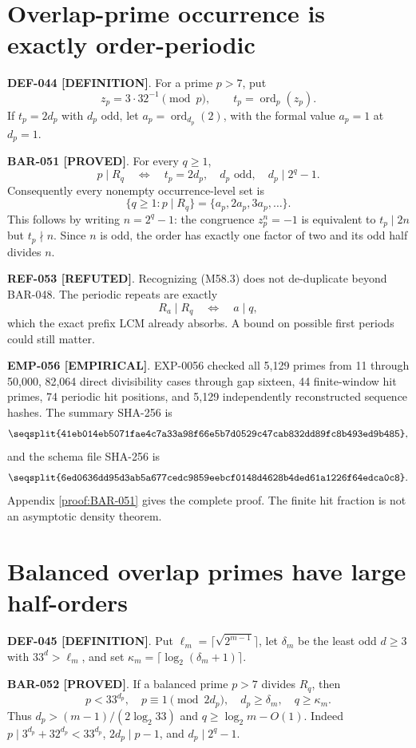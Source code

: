 \documentclass[11pt]{article}
\newcommand{\claimstatus}[2]{\textbf{#1 [#2]}}
\begin{document}
\section{Overlap-prime occurrence is exactly order-periodic}

\claimstatus{DEF-044}{DEFINITION}. For a prime \(p>7\), put
\[
z_p=3\cdot32^{-1}\pmod p,\qquad
t_p=\operatorname{ord}_p(z_p).
\tag{M58.1}
\]
If \(t_p=2d_p\) with \(d_p\) odd, let
\(a_p=\operatorname{ord}_{d_p}(2)\), with the formal value \(a_p=1\) at
\(d_p=1\).

\claimstatus{BAR-051}{PROVED}. For every \(q\ge1\),
\[
p\mid R_q
\quad\Longleftrightarrow\quad
t_p=2d_p,\quad d_p\text{ odd},\quad d_p\mid2^q-1.
\tag{M58.2}
\]
Consequently every nonempty occurrence-level set is
\[
\{q\ge1:p\mid R_q\}
=\{a_p,2a_p,3a_p,\ldots\}.
\tag{M58.3}
\]
This follows by writing \(n=2^q-1\): the congruence
\(z_p^n=-1\) is equivalent to \(t_p\mid2n\) but
\(t_p\nmid n\). Since \(n\) is odd, the order has exactly one factor of
two and its odd half divides \(n\).

\claimstatus{REF-053}{REFUTED}. Recognizing (M58.3) does not
de-duplicate beyond BAR-048. The periodic repeats are exactly
\[
R_a\mid R_q\quad\Longleftrightarrow\quad a\mid q,
\tag{M58.4}
\]
which the exact prefix LCM already absorbs. A bound on possible first
periods could still matter.

\claimstatus{EMP-056}{EMPIRICAL}. EXP-0056 checked all 5,129 primes from
11 through 50,000, 82,064 direct divisibility cases through gap sixteen,
44 finite-window hit primes, 74 periodic hit positions, and 5,129
independently reconstructed sequence hashes. The summary SHA-256 is
\[
\texttt{\seqsplit{41eb014eb5071fae4c7a33a98f66e5b7d0529c47cab832dd89fc8b493ed9b485}},
\]
and the schema file SHA-256 is
\[
\texttt{\seqsplit{6ed0636dd95d3ab5a677cedc9859eebcf0148d4628b4ded61a1226f64edca0c8}}.
\]
Appendix \ref{proof:BAR-051} gives the complete proof. The finite hit
fraction is not an asymptotic density theorem.

\section{Balanced overlap primes have large half-orders}

\claimstatus{DEF-045}{DEFINITION}. Put
\(\ell_m=\lceil\sqrt{2^{m-1}}\rceil\), let \(\delta_m\) be the least odd
\(d\ge3\) with \(33^d>\ell_m\), and set
\(\kappa_m=\lceil\log_2(\delta_m+1)\rceil\).

\claimstatus{BAR-052}{PROVED}. If a balanced prime \(p>7\) divides
\(R_q\), then
\[
p<33^{d_p},\quad p\equiv1\pmod{2d_p},\quad
d_p\ge\delta_m,\quad q\ge\kappa_m.
\tag{M59.1}
\]
Thus \(d_p>(m-1)/(2\log_2 33)\) and
\(q\ge\log_2m-O(1)\). Indeed
\(p\mid3^{d_p}+32^{d_p}<33^{d_p}\),
\(2d_p\mid p-1\), and \(d_p\mid2^q-1\).
\end{document}
